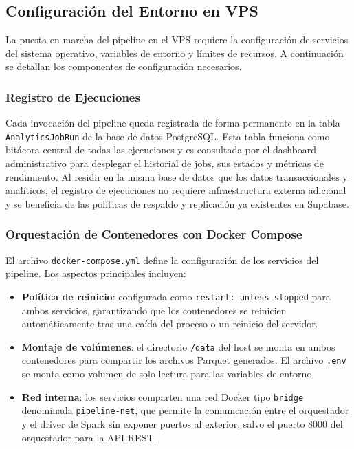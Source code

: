 \subsection{Configuración del Entorno en VPS}

La puesta en marcha del pipeline en el VPS requiere la configuración
de servicios del sistema operativo, variables de entorno y límites de
recursos. A continuación se detallan los componentes de configuración
necesarios.

\subsubsection{Registro de Ejecuciones}

Cada invocación del pipeline queda registrada de forma permanente en la
tabla \texttt{AnalyticsJobRun} de la base de datos PostgreSQL. Esta
tabla funciona como bitácora central de todas las ejecuciones y es
consultada por el dashboard administrativo para desplegar el historial
de jobs, sus estados y métricas de rendimiento. Al residir en la misma
base de datos que los datos transaccionales y analíticos, el registro de
ejecuciones no requiere infraestructura externa adicional y se beneficia
de las políticas de respaldo y replicación ya existentes en Supabase.

\subsubsection{Orquestación de Contenedores con Docker Compose}

El archivo \texttt{docker-compose.yml} define la configuración de los
servicios del pipeline. Los aspectos principales incluyen:

\begin{itemize}[leftmargin=1.5em]
  \item \textbf{Política de reinicio}: configurada como
  \texttt{restart: unless-stopped} para ambos servicios, garantizando
  que los contenedores se reinicien automáticamente tras una caída del
  proceso o un reinicio del servidor.
  \item \textbf{Montaje de volúmenes}: el directorio
  \texttt{/data} del host se monta en ambos contenedores para
  compartir los archivos Parquet generados. El archivo
  \texttt{.env} se monta como volumen de solo lectura para las
  variables de entorno.
  \item \textbf{Red interna}: los servicios comparten una red Docker
  tipo \texttt{bridge} denominada \texttt{pipeline-net}, que permite
  la comunicación entre el orquestador y el driver de Spark sin
  exponer puertos al exterior, salvo el puerto 8000 del orquestador
  para la API REST.
\end{itemize}

